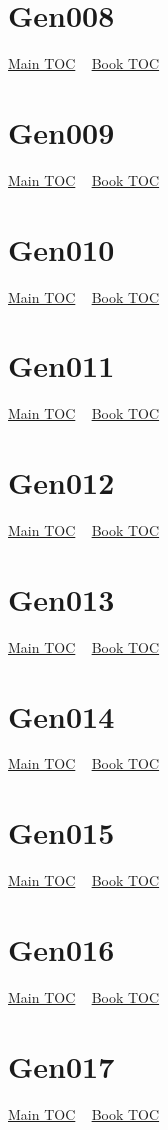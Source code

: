\documentclass{book}
\begin{document}
  \section{Gen008}\hyperlink{toc}{Main TOC} ~ \hyperref[subsec:Gen]{Book TOC} 
  \section{Gen009}\hyperlink{toc}{Main TOC} ~ \hyperref[subsec:Gen]{Book TOC} 
  \section{Gen010}\hyperlink{toc}{Main TOC} ~ \hyperref[subsec:Gen]{Book TOC} 
  \section{Gen011}\hyperlink{toc}{Main TOC} ~ \hyperref[subsec:Gen]{Book TOC} 
  \section{Gen012}\hyperlink{toc}{Main TOC} ~ \hyperref[subsec:Gen]{Book TOC} 
  \section{Gen013}\hyperlink{toc}{Main TOC} ~ \hyperref[subsec:Gen]{Book TOC} 
  \section{Gen014}\hyperlink{toc}{Main TOC} ~ \hyperref[subsec:Gen]{Book TOC} 
  \section{Gen015}\hyperlink{toc}{Main TOC} ~ \hyperref[subsec:Gen]{Book TOC} 
  \section{Gen016}\hyperlink{toc}{Main TOC} ~ \hyperref[subsec:Gen]{Book TOC} 
  \section{Gen017}\hyperlink{toc}{Main TOC} ~ \hyperref[subsec:Gen]{Book TOC} 
\end{document}
